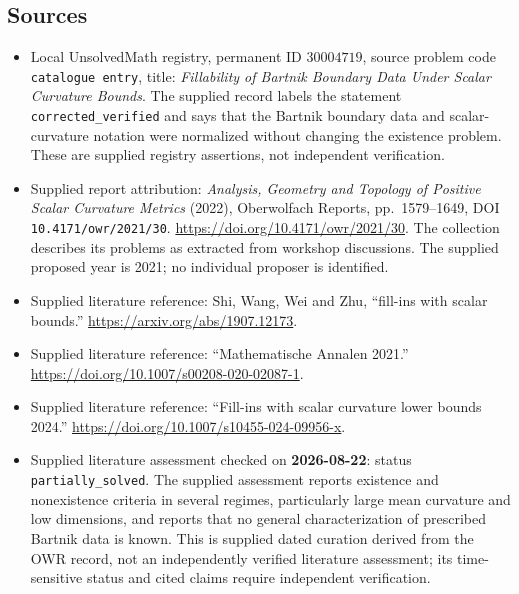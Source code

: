 \documentclass[11pt]{article}
\begin{document}
\subsection{Sources}
\begin{itemize}
\item Local UnsolvedMath registry, permanent ID $30004719$, source problem code \texttt{catalogue entry}, title: \emph{Fillability of Bartnik Boundary Data Under Scalar Curvature Bounds}. The supplied record labels the statement \texttt{corrected\_verified} and says that the Bartnik boundary data and scalar-curvature notation were normalized without changing the existence problem. These are supplied registry assertions, not independent verification.
\item Supplied report attribution: \emph{Analysis, Geometry and Topology of Positive Scalar Curvature Metrics} (2022), Oberwolfach Reports, pp.~1579--1649, DOI \texttt{10.4171/owr/2021/30}. \url{https://doi.org/10.4171/owr/2021/30}. The collection describes its problems as extracted from workshop discussions. The supplied proposed year is 2021; no individual proposer is identified.
\item Supplied literature reference: Shi, Wang, Wei and Zhu, ``fill-ins with scalar bounds.'' \url{https://arxiv.org/abs/1907.12173}.
\item Supplied literature reference: ``Mathematische Annalen 2021.'' \url{https://doi.org/10.1007/s00208-020-02087-1}.
\item Supplied literature reference: ``Fill-ins with scalar curvature lower bounds 2024.'' \url{https://doi.org/10.1007/s10455-024-09956-x}.
\item Supplied literature assessment checked on \textbf{2026-08-22}: status \texttt{partially\_solved}. The supplied assessment reports existence and nonexistence criteria in several regimes, particularly large mean curvature and low dimensions, and reports that no general characterization of prescribed Bartnik data is known. This is supplied dated curation derived from the OWR record, not an independently verified literature assessment; its time-sensitive status and cited claims require independent verification.
\end{itemize}
\end{document}
